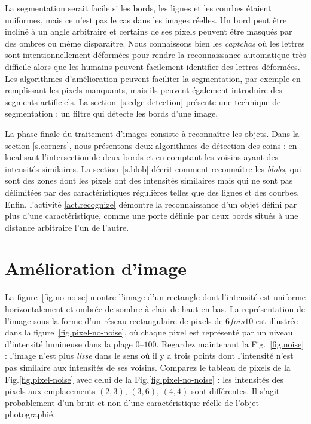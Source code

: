 La segmentation serait facile si les bords, les lignes et les courbes étaient uniformes, mais ce n'est pas le cas dans les images réelles. Un bord peut être incliné à un angle arbitraire et certains de ses pixels peuvent être masqués par des ombres ou même disparaître. Nous connaissons bien les \emph{captchas} où les lettres sont intentionnellement déformées pour rendre la reconnaissance automatique très difficile alors que les humains peuvent facilement identifier des lettres déformées. Les algorithmes d'amélioration peuvent faciliter la segmentation, par exemple en remplissant les pixels manquants, mais ils peuvent également introduire des segments artificiels. La section~\ref{s.edge-detection} présente une technique de segmentation : un filtre qui détecte les bords d'une image.

La phase finale du traitement d'images consiste à reconnaître les objets. Dans la section \ref{s.corners}, nous présentons deux algorithmes de détection des coins : en localisant l'intersection de deux bords et en comptant les voisins ayant des intensités similaires. La section~\ref{s.blob} décrit comment reconnaître les \emph{blobs}, qui sont des zones dont les pixels ont des intensités similaires mais qui ne sont pas délimitées par des caractéristiques régulières telles que des lignes et des courbes. Enfin, l'activité \ref{act.recognize} démontre la reconnaissance d'un objet défini par plus d'une caractéristique, comme une porte définie par deux bords situés à une distance arbitraire l'un de l'autre.

\section{Amélioration d'image}\label{s.enhance}

La figure~\ref{fig.no-noise} montre l'image d'un rectangle dont l'intensité est uniforme horizontalement et ombrée de sombre à clair de haut en bas. La représentation de l'image sous la forme d'un réseau rectangulaire de pixels de $6 fois 10$ est illustrée dans la figure~\ref{fig.pixel-no-noise}, où chaque pixel est représenté par un niveau d'intensité lumineuse dans la plage $0$--$100$. Regardez maintenant la Fig.~\ref{fig.noise} : l'image n'est plus \emph{lisse} dans le sens où il y a trois points dont l'intensité n'est pas similaire aux intensités de ses voisins. Comparez le tableau de pixels de la Fig.\ref{fig.pixel-noise} avec celui de la Fig.\ref{fig.pixel-no-noise} : les intensités des pixels aux emplacements $(2,3)$, $(3,6)$, $(4,4)$ sont différentes. Il s'agit probablement d'un bruit et non d'une caractéristique réelle de l'objet photographié. 

